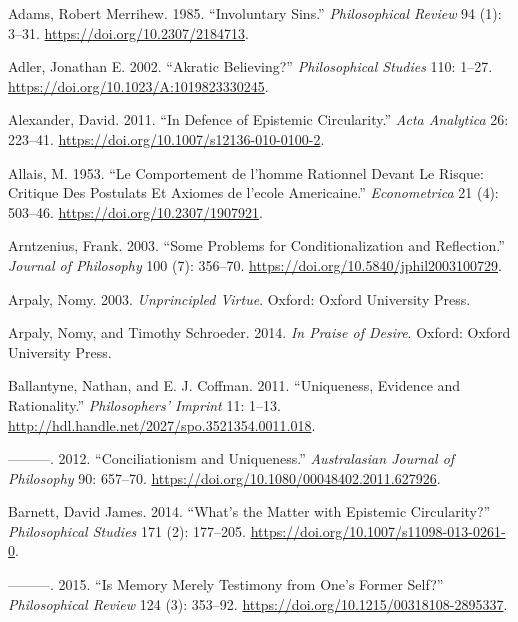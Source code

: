 \documentclass[
  10pt,
  letterpaper,
  twoside]{scrbook}
\newlength{\cslhangindent}
\newenvironment{CSLReferences}[2] %
 {\begin{list}{}{%
  \setlength{\itemindent}{0pt}
  \setlength{\leftmargin}{0pt}
  \setlength{\parsep}{0pt}
  \ifodd #1
   \setlength{\leftmargin}{\cslhangindent}
   \setlength{\itemindent}{-1\cslhangindent}
  \fi
  \setlength{\itemsep}{#2\baselineskip}}}
 {\end{list}}
\begin{document}
\label{refs}
\begin{CSLReferences}{1}{0}
Adams, Robert Merrihew. 1985. {``Involuntary Sins.''}
\emph{Philosophical Review} 94 (1): 3--31.
\url{https://doi.org/10.2307/2184713}.

Adler, Jonathan E. 2002. {``Akratic Believing?''} \emph{Philosophical
Studies} 110: 1--27. \url{https://doi.org/10.1023/A:1019823330245}.

Alexander, David. 2011. {``In Defence of Epistemic Circularity.''}
\emph{Acta Analytica} 26: 223--41.
\url{https://doi.org/10.1007/s12136-010-0100-2}.

Allais, M. 1953. {``Le Comportement de l'homme Rationnel Devant Le
Risque: Critique Des Postulats Et Axiomes de l'ecole Americaine.''}
\emph{Econometrica} 21 (4): 503--46.
\url{https://doi.org/10.2307/1907921}.

Arntzenius, Frank. 2003. {``Some Problems for Conditionalization and
Reflection.''} \emph{Journal of Philosophy} 100 (7): 356--70.
\url{https://doi.org/10.5840/jphil2003100729}.

Arpaly, Nomy. 2003. \emph{Unprincipled Virtue}. Oxford: Oxford
University Press.

Arpaly, Nomy, and Timothy Schroeder. 2014. \emph{In Praise of Desire}.
Oxford: Oxford University Press.

Ballantyne, Nathan, and E. J. Coffman. 2011. {``Uniqueness, Evidence and
Rationality.''} \emph{Philosophers' Imprint} 11: 1--13.
\url{http://hdl.handle.net/2027/spo.3521354.0011.018}.

---------. 2012. {``Conciliationism and Uniqueness.''}
\emph{Australasian Journal of Philosophy} 90: 657--70.
\url{https://doi.org/10.1080/00048402.2011.627926}.

Barnett, David James. 2014. {``What's the Matter with Epistemic
Circularity?''} \emph{Philosophical Studies} 171 (2): 177--205.
\url{https://doi.org/10.1007/s11098-013-0261-0}.

---------. 2015. {``Is Memory Merely Testimony from One's Former
Self?''} \emph{Philosophical Review} 124 (3): 353--92.
\url{https://doi.org/10.1215/00318108-2895337}.


\end{CSLReferences}
\end{document}
